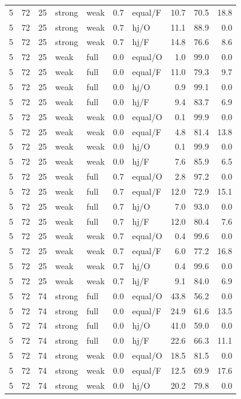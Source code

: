 {\begin{longtable}{@{}rrrllllrrr@{}}
5 & 72 & 25 & strong & weak & 0.7 & equal/F & 10.7 & 70.5 & 18.8\\
5 & 72 & 25 & strong & weak & 0.7 & hj/O & 11.1 & 88.9 & 0.0\\
5 & 72 & 25 & strong & weak & 0.7 & hj/F & 14.8 & 76.6 & 8.6\\
5 & 72 & 25 & weak & full & 0.0 & equal/O & 1.0 & 99.0 & 0.0\\
5 & 72 & 25 & weak & full & 0.0 & equal/F & 11.0 & 79.3 & 9.7\\
5 & 72 & 25 & weak & full & 0.0 & hj/O & 0.9 & 99.1 & 0.0\\
5 & 72 & 25 & weak & full & 0.0 & hj/F & 9.4 & 83.7 & 6.9\\
5 & 72 & 25 & weak & weak & 0.0 & equal/O & 0.1 & 99.9 & 0.0\\
5 & 72 & 25 & weak & weak & 0.0 & equal/F & 4.8 & 81.4 & 13.8\\
5 & 72 & 25 & weak & weak & 0.0 & hj/O & 0.1 & 99.9 & 0.0\\
5 & 72 & 25 & weak & weak & 0.0 & hj/F & 7.6 & 85.9 & 6.5\\
5 & 72 & 25 & weak & full & 0.7 & equal/O & 2.8 & 97.2 & 0.0\\
5 & 72 & 25 & weak & full & 0.7 & equal/F & 12.0 & 72.9 & 15.1\\
5 & 72 & 25 & weak & full & 0.7 & hj/O & 7.0 & 93.0 & 0.0\\
5 & 72 & 25 & weak & full & 0.7 & hj/F & 12.0 & 80.4 & 7.6\\
5 & 72 & 25 & weak & weak & 0.7 & equal/O & 0.4 & 99.6 & 0.0\\
5 & 72 & 25 & weak & weak & 0.7 & equal/F & 6.0 & 77.2 & 16.8\\
5 & 72 & 25 & weak & weak & 0.7 & hj/O & 0.4 & 99.6 & 0.0\\
5 & 72 & 25 & weak & weak & 0.7 & hj/F & 9.1 & 84.0 & 6.9\\
5 & 72 & 74 & strong & full & 0.0 & equal/O & 43.8 & 56.2 & 0.0\\
5 & 72 & 74 & strong & full & 0.0 & equal/F & 24.9 & 61.6 & 13.5\\
5 & 72 & 74 & strong & full & 0.0 & hj/O & 41.0 & 59.0 & 0.0\\
5 & 72 & 74 & strong & full & 0.0 & hj/F & 22.6 & 66.3 & 11.1\\
5 & 72 & 74 & strong & weak & 0.0 & equal/O & 18.5 & 81.5 & 0.0\\
5 & 72 & 74 & strong & weak & 0.0 & equal/F & 12.5 & 69.9 & 17.6\\
5 & 72 & 74 & strong & weak & 0.0 & hj/O & 20.2 & 79.8 & 0.0\\

\end{longtable}}
